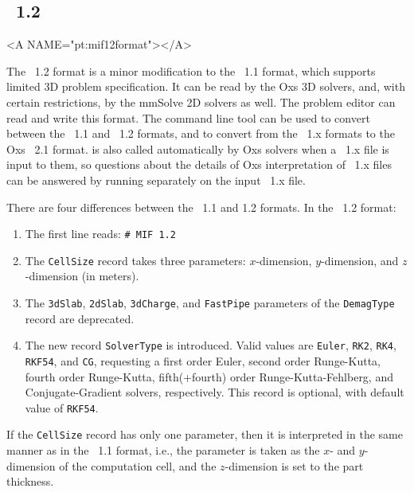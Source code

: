 \subsection{\MIF\ 1.2}\label{sec:mif12format}
\begin{rawhtml}
<A NAME="pt:mif12format"></A>
\end{rawhtml}
The \MIF~1.2 format is a minor modification to the \MIF~1.1 format,
which supports limited 3D problem specification.  It can be read by the
Oxs 3D solvers, and, with certain restrictions, by the mmSolve 2D
solvers as well.  The  problem editor can read and
write this format.  The
 command line tool can be used to convert
between the \MIF~1.1 and \MIF~1.2 formats, and to convert from the
\MIF~1.x formats to the Oxs \MIF~2.1 format.   is also
called automatically by Oxs solvers when a \MIF~1.x file is input to
them, so questions about the details of Oxs interpretation of \MIF~1.x
files can be answered by running  separately on the
input \MIF~1.x file.

There are four differences between the \MIF~1.1 and 1.2 formats.  In
the \MIF~1.2 format:
\begin{enumerate}
\item The first line reads: \verb+# MIF 1.2+
\item The \texttt{CellSize} record takes three parameters:
      $x$-dimension, $y$-dimension, and $z$-dimension (in meters).
\item The \texttt{3dSlab}, \texttt{2dSlab}, \texttt{3dCharge}, and
      \texttt{FastPipe} parameters of the \texttt{DemagType} record
      are deprecated.
\item The new record \texttt{SolverType} is introduced.  Valid values
      are \texttt{Euler}, \texttt{RK2}, \texttt{RK4}, \texttt{RKF54},
      and \texttt{CG}, requesting a first order Euler, second order
      Runge-Kutta, fourth order Runge-Kutta, fifth(+fourth) order
      Runge-Kutta-Fehlberg, and Conjugate-Gradient solvers,
      respectively.  This record is optional, with default value of
      \texttt{RKF54}.
\end{enumerate}
If the \texttt{CellSize} record has only one parameter, then it is
interpreted in the same manner as in the \MIF~1.1 format, i.e., the
parameter is taken as the $x$- and $y$-dimension of the computation
cell, and the $z$-dimension is set to the part thickness.

